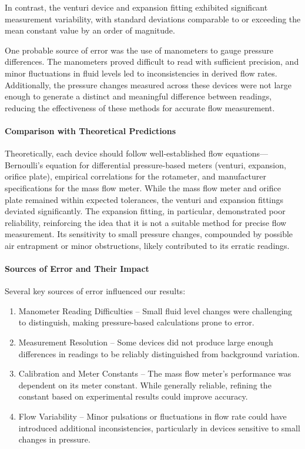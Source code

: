\documentclass[11pt]{article}
\providecommand{\tightlist}{%
      \setlength{\itemsep}{0pt}\setlength{\parskip}{0pt}}
\begin{document}
In contrast, the venturi device and expansion fitting exhibited
significant measurement variability, with standard deviations comparable
to or exceeding the mean constant value by an order of magnitude.

One probable source of error was the use of manometers to gauge pressure
differences. The manometers proved difficult to read with sufficient
precision, and minor fluctuations in fluid levels led to inconsistencies
in derived flow rates. Additionally, the pressure changes measured
across these devices were not large enough to generate a distinct and
meaningful difference between readings, reducing the effectiveness of
these methods for accurate flow measurement.

\hypertarget{comparison-with-theoretical-predictions}{%
\paragraph{Comparison with Theoretical
Predictions}\label{comparison-with-theoretical-predictions}}

Theoretically, each device should follow well-established flow
equations---Bernoulli's equation for differential pressure-based meters
(venturi, expansion, orifice plate), empirical correlations for the
rotameter, and manufacturer specifications for the mass flow meter.
While the mass flow meter and orifice plate remained within expected
tolerances, the venturi and expansion fittings deviated significantly.
The expansion fitting, in particular, demonstrated poor reliability,
reinforcing the idea that it is not a suitable method for precise flow
measurement. Its sensitivity to small pressure changes, compounded by
possible air entrapment or minor obstructions, likely contributed to its
erratic readings.

\hypertarget{sources-of-error-and-their-impact}{%
\paragraph{Sources of Error and Their
Impact}\label{sources-of-error-and-their-impact}}

Several key sources of error influenced our results:

\begin{enumerate}
\def\labelenumi{\arabic{enumi}.}
\tightlist
\item
  Manometer Reading Difficulties -- Small fluid level changes were
  challenging to distinguish, making pressure-based calculations prone
  to error.
\item
  Measurement Resolution -- Some devices did not produce large enough
  differences in readings to be reliably distinguished from background
  variation.
\item
  Calibration and Meter Constants -- The mass flow meter's performance
  was dependent on its meter constant. While generally reliable,
  refining the constant based on experimental results could improve
  accuracy.
\item
  Flow Variability -- Minor pulsations or fluctuations in flow rate
  could have introduced additional inconsistencies, particularly in
  devices sensitive to small changes in pressure.
\end{enumerate}
\end{document}
